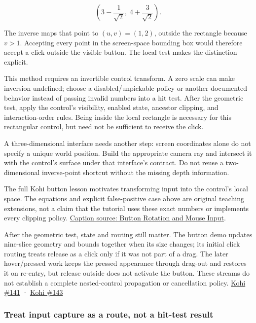 \[
\left(3-\frac1{\sqrt2},\;4+\frac3{\sqrt2}\right).
\]

The inverse maps that point to \((u,v)=(1,2)\), outside the rectangle because \(v>1\). Accepting every point in the screen-space bounding box would therefore accept a click outside the visible button. The local test makes the distinction explicit.

This method requires an invertible control transform. A zero scale can make inversion undefined; choose a disabled/unpickable policy or another documented behavior instead of passing invalid numbers into a hit test. After the geometric test, apply the control's visibility, enabled state, ancestor clipping, and interaction-order rules. Being inside the local rectangle is necessary for this rectangular control, but need not be sufficient to receive the click.

A three-dimensional interface needs another step: screen coordinates alone do not specify a unique world position. Build the appropriate camera ray and intersect it with the control's surface under that interface's contract. Do not reuse a two-dimensional inverse-point shortcut without the missing depth information.

The full Kohi button lesson motivates transforming input into the control's local space. The equations and explicit false-positive case above are original teaching extensions, not a claim that the tutorial uses these exact numbers or implements every clipping policy. \href{https://www.youtube.com/watch?v=VuPFUCVGy9U}{Caption source: Button Rotation and Mouse Input}.

After the geometric test, state and routing still matter. The button demo updates nine-slice geometry and bounds together when its size changes; its initial click routing treats release as a click only if it was not part of a drag. The later hover/pressed work keeps the pressed appearance through drag-out and restores it on re-entry, but release outside does not activate the button. These streams do not establish a complete nested-control propagation or cancellation policy. \href{https://www.youtube.com/watch?v=VuPFUCVGy9U}{Kohi \#141} · \href{https://www.youtube.com/watch?v=jLSfss8YrXE}{Kohi \#143}

\subsubsection{Treat input capture as a route, not a hit-test result}\label{treat-input-capture-as-a-route-not-a-hit-test-result}

